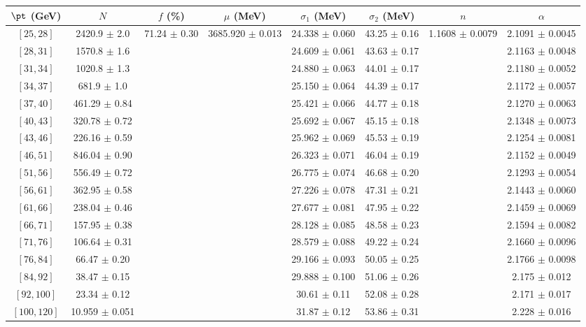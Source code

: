 \begin{tabular}{c||c|c|c|c|c|c|c}
$\pt$ (GeV) & $N$ & $f$ (\%) & $\mu$ (MeV) & $\sigma_1$ (MeV) & $\sigma_2$ (MeV) & $n$ & $\alpha$ \\
\hline
$[25, 28]$ & 2420.9 $\pm$ 2.0 & \multirow{17}{*}{71.24 $\pm$ 0.30} & \multirow{17}{*}{3685.920 $\pm$ 0.013} & 24.338 $\pm$ 0.060 & 43.25 $\pm$ 0.16 & \multirow{17}{*}{1.1608 $\pm$ 0.0079} & 2.1091 $\pm$ 0.0045\\
$[28, 31]$ & 1570.8 $\pm$ 1.6 &  &  & 24.609 $\pm$ 0.061 & 43.63 $\pm$ 0.17 &  & 2.1163 $\pm$ 0.0048\\
$[31, 34]$ & 1020.8 $\pm$ 1.3 &  &  & 24.880 $\pm$ 0.063 & 44.01 $\pm$ 0.17 &  & 2.1180 $\pm$ 0.0052\\
$[34, 37]$ & 681.9 $\pm$ 1.0 &  &  & 25.150 $\pm$ 0.064 & 44.39 $\pm$ 0.17 &  & 2.1172 $\pm$ 0.0057\\
$[37, 40]$ & 461.29 $\pm$ 0.84 &  &  & 25.421 $\pm$ 0.066 & 44.77 $\pm$ 0.18 &  & 2.1270 $\pm$ 0.0063\\
$[40, 43]$ & 320.78 $\pm$ 0.72 &  &  & 25.692 $\pm$ 0.067 & 45.15 $\pm$ 0.18 &  & 2.1348 $\pm$ 0.0073\\
$[43, 46]$ & 226.16 $\pm$ 0.59 &  &  & 25.962 $\pm$ 0.069 & 45.53 $\pm$ 0.19 &  & 2.1254 $\pm$ 0.0081\\
$[46, 51]$ & 846.04 $\pm$ 0.90 &  &  & 26.323 $\pm$ 0.071 & 46.04 $\pm$ 0.19 &  & 2.1152 $\pm$ 0.0049\\
$[51, 56]$ & 556.49 $\pm$ 0.72 &  &  & 26.775 $\pm$ 0.074 & 46.68 $\pm$ 0.20 &  & 2.1293 $\pm$ 0.0054\\
$[56, 61]$ & 362.95 $\pm$ 0.58 &  &  & 27.226 $\pm$ 0.078 & 47.31 $\pm$ 0.21 &  & 2.1443 $\pm$ 0.0060\\
$[61, 66]$ & 238.04 $\pm$ 0.46 &  &  & 27.677 $\pm$ 0.081 & 47.95 $\pm$ 0.22 &  & 2.1459 $\pm$ 0.0069\\
$[66, 71]$ & 157.95 $\pm$ 0.38 &  &  & 28.128 $\pm$ 0.085 & 48.58 $\pm$ 0.23 &  & 2.1594 $\pm$ 0.0082\\
$[71, 76]$ & 106.64 $\pm$ 0.31 &  &  & 28.579 $\pm$ 0.088 & 49.22 $\pm$ 0.24 &  & 2.1660 $\pm$ 0.0096\\
$[76, 84]$ & 66.47 $\pm$ 0.20 &  &  & 29.166 $\pm$ 0.093 & 50.05 $\pm$ 0.25 &  & 2.1766 $\pm$ 0.0098\\
$[84, 92]$ & 38.47 $\pm$ 0.15 &  &  & 29.888 $\pm$ 0.100 & 51.06 $\pm$ 0.26 &  & 2.175 $\pm$ 0.012\\
$[92, 100]$ & 23.34 $\pm$ 0.12 &  &  & 30.61 $\pm$ 0.11 & 52.08 $\pm$ 0.28 &  & 2.171 $\pm$ 0.017\\
$[100, 120]$ & 10.959 $\pm$ 0.051 &  &  & 31.87 $\pm$ 0.12 & 53.86 $\pm$ 0.31 &  & 2.228 $\pm$ 0.016\\
\end{tabular}
